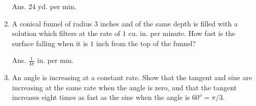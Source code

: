 \begin{enumerate}
Ans. $24$ yd. per min.

\item
A conical funnel of radius $3$ inches and of the same depth 
is filled with a solution which filters at the rate of $1$ cu. in. 
per minute. How fast is the surface falling when it is $1$ 
inch from the top of the funnel? 

Ans. $\frac{1}{4 \pi}$ in. per mm.

\item
An angle is increasing at a constant rate. Show that the 
tangent and sine are increasing at the same rate when the 
angle is zero, and that the tangent increases eight times 
as fast as the sine when the angle is $60^o=\pi/3$.

\end{enumerate}
